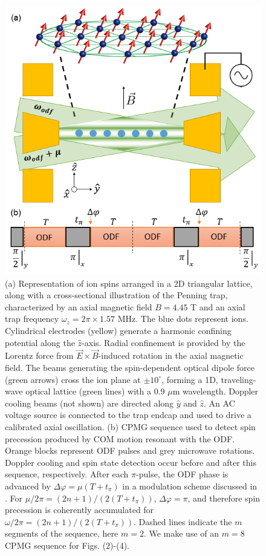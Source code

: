 \documentclass[aps,prl,twocolumn,superscriptaddress,floatfix]{revtex4-1}
\begin{document}
\begin{figure}
    \centering
    \includegraphics[width=.45\textwidth]{expt_cpmg}
    \caption{(a) Representation of ion spins arranged in a 2D triangular lattice, along with a cross-sectional illustration of the Penning trap, characterized by an axial magnetic field $B = 4.45$ T and an axial trap frequency $\omega_z = 2\pi \times 1.57$ MHz. The blue dots represent ions. Cylindrical electrodes (yellow) generate a harmonic confining potential along the $\hat{z}$-axis. Radial confinement is provided by the Lorentz force from $\vec{E} \times \vec{B}$-induced rotation in the axial magnetic field. The beams generating the spin-dependent optical dipole force (green arrows) cross the ion plane at $\pm 10^{\circ}$, forming a 1D, traveling-wave optical lattice (green lines) with a 0.9 $\mu$m wavelength. Doppler cooling beams (not shown) are directed along $\hat{y}$ and $\hat{z}$. An AC voltage source is connected to the trap endcap and used to drive a calibrated axial oscillation. (b) CPMG sequence used to detect spin precession produced by COM motion resonant with the ODF. Orange blocks represent ODF pulses and grey microwave rotations. Doppler cooling and spin state detection occur before and after this sequence, respectively. After each $\pi$-pulse, the ODF phase is advanced by $\Delta\varphi = \mu(T+t_{\pi})$ in a modulation scheme discussed in \citep{SuppMat}. For $\mu/2\pi = (2n+1)/(2(T+t_{\pi}))$, $\Delta\varphi = \pi$, and therefore spin precession is coherently accumulated for $\omega/2\pi = (2n+1)/(2(T+t_{\pi}))$. Dashed lines indicate the $m$ segments of the sequence, here $m = 2$. We make use of an $m = 8$ CPMG sequence for Figs. (2)-(4).} 
    \label{Expt}
\end{figure}
\end{document}
